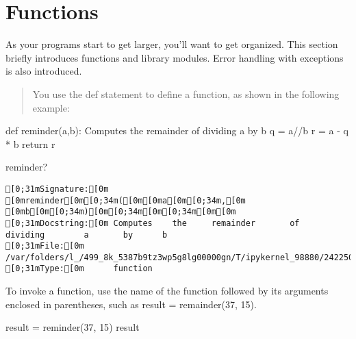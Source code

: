 \documentclass[
  letterpaper,
  DIV=11,
  numbers=noendperiod]{scrreprt}
\newenvironment{Shaded}{\begin{snugshade}}{\end{snugshade}}
\newcommand{\CommentTok}[1]{\textcolor[rgb]{0.37,0.37,0.37}{#1}}
\newcommand{\ControlFlowTok}[1]{\textcolor[rgb]{0.00,0.46,0.62}{#1}}
\newcommand{\DecValTok}[1]{\textcolor[rgb]{0.68,0.00,0.00}{#1}}
\newcommand{\KeywordTok}[1]{\textcolor[rgb]{0.00,0.46,0.62}{#1}}
\newcommand{\NormalTok}[1]{\textcolor[rgb]{0.00,0.46,0.62}{#1}}
\newcommand{\OperatorTok}[1]{\textcolor[rgb]{0.37,0.37,0.37}{#1}}
\begin{document}
\hypertarget{functions}{%
\section{Functions}\label{functions}}

As your programs start to get larger, you'll want to get organized. This
section briefly introduces functions and library modules. Error handling
with exceptions is also introduced.

\begin{quote}
You use the def statement to define a function, as shown in the
following example:
\end{quote}

\begin{Shaded}
\begin{Highlighting}[]
\KeywordTok{def}\NormalTok{ reminder(a,b):  }
    \CommentTok{\textquotesingle{}\textquotesingle{}\textquotesingle{}  }
\CommentTok{    Computes    the remainder   of  dividing    a   by  b               }
\CommentTok{    \textquotesingle{}\textquotesingle{}\textquotesingle{}}                 
\NormalTok{    q   }\OperatorTok{=}\NormalTok{   a}\OperatorTok{//}\NormalTok{b}
\NormalTok{    r   }\OperatorTok{=}\NormalTok{   a }\OperatorTok{{-}}\NormalTok{ q }\OperatorTok{*}\NormalTok{ b }
    \ControlFlowTok{return}\NormalTok{  r}
\end{Highlighting}
\end{Shaded}

\begin{Shaded}
\begin{Highlighting}[]
\NormalTok{reminder?}
\end{Highlighting}
\end{Shaded}

\begin{verbatim}
[0;31mSignature:[0m [0mreminder[0m[0;34m([0m[0ma[0m[0;34m,[0m [0mb[0m[0;34m)[0m[0;34m[0m[0;34m[0m[0m
[0;31mDocstring:[0m Computes    the     remainder       of      dividing        a       by      b                               
[0;31mFile:[0m      /var/folders/l_/499_8k_5387b9tz3wp5g8lg00000gn/T/ipykernel_98880/2422504948.py
[0;31mType:[0m      function
\end{verbatim}

To invoke a function, use the name of the function followed by its
arguments enclosed in parentheses, such as result = remainder(37, 15).

\begin{Shaded}
\begin{Highlighting}[]
\NormalTok{result }\OperatorTok{=}\NormalTok{ reminder(}\DecValTok{37}\NormalTok{, }\DecValTok{15}\NormalTok{)}
\NormalTok{result}
\end{Highlighting}
\end{Shaded}
\end{document}
